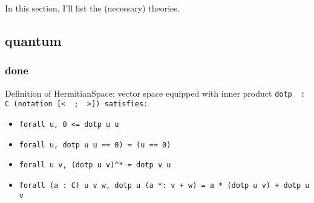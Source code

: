 In this section, I'll list the (necessary) theories.

\subsection{quantum}

\subsubsection{done}

\noindent Definition of HermitianSpace: vector space equipped with inner product \tt{dotp \us\ \us : C} (notation \tt{[< \tus\ ; \tus\ >]}) satisfies:
\begin{itemize}
\item \tt{forall u, 0 <= dotp u u}
\item \tt{forall u, dotp u u == 0) = (u == 0)}
\item \tt{forall u v, (dotp u v)\^{}* = dotp v u}
\item \tt{forall (a : C) u v w, dotp u (a *: v + w) = a * (dotp u v) + dotp u v}
\end{itemize}

